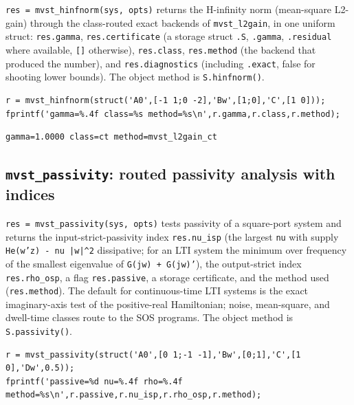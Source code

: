 \documentclass[11pt,oneside]{report}
\newcommand{\code}[1]{\texttt{#1}}
\begin{document}
\code{res = mvst\_hinfnorm(sys, opts)} returns the H-infinity norm (mean-square
L2-gain) through the class-routed exact backends of \code{mvst\_l2gain}, in one
uniform struct: \code{res.gamma}, \code{res.certificate} (a storage struct \code{.S}, \code{.gamma},
\code{.residual} where available, \code{[]} otherwise), \code{res.class}, \code{res.method} (the
backend that produced the number), and \code{res.diagnostics} (including \code{.exact},
false for shooting lower bounds). The object method is \code{S.hinfnorm()}.

\begin{lstlisting}[style=matlabstyle]
r = mvst_hinfnorm(struct('A0',[-1 1;0 -2],'Bw',[1;0],'C',[1 0]));
fprintf('gamma=%.4f class=%s method=%s\n',r.gamma,r.class,r.method);
\end{lstlisting}

\begin{lstlisting}[style=outputstyle]
gamma=1.0000 class=ct method=mvst_l2gain_ct
\end{lstlisting}

\hypertarget{mvst_passivity-routed-passivity-analysis-with-indices}{%
\subsection{\texorpdfstring{\code{mvst\_passivity}: routed passivity analysis with indices}{mvst\_passivity: routed passivity analysis with indices}}\label{mvst_passivity-routed-passivity-analysis-with-indices}}

\code{res = mvst\_passivity(sys, opts)} tests passivity of a square-port system and
returns the input-strict-passivity index \code{res.nu\_isp} (the largest \code{nu} with
supply \code{He(w'z) - nu |w|\^{}2} dissipative; for an LTI system the minimum over
frequency of the smallest eigenvalue of \code{G(jw) + G(jw)'}), the output-strict
index \code{res.rho\_osp}, a flag \code{res.passive}, a storage certificate, and the
method used (\code{res.method}). The default for continuous-time LTI systems is the
exact imaginary-axis test of the positive-real Hamiltonian; noise, mean-square,
and dwell-time classes route to the SOS programs. The object method is
\code{S.passivity()}.

\begin{lstlisting}[style=matlabstyle]
r = mvst_passivity(struct('A0',[0 1;-1 -1],'Bw',[0;1],'C',[1 0],'Dw',0.5));
fprintf('passive=%d nu=%.4f rho=%.4f method=%s\n',r.passive,r.nu_isp,r.rho_osp,r.method);
\end{lstlisting}
\end{document}
